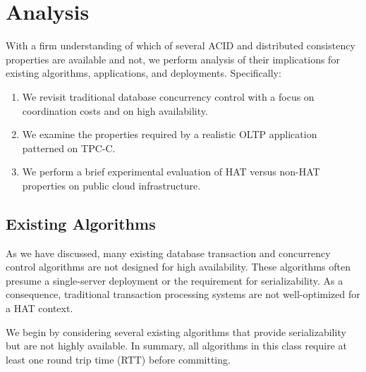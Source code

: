 
\section{Analysis}
\label{sec:evaluation}

With a firm understanding of which of several ACID and distributed
consistency properties are available and not, we perform analysis of
their implications for existing algorithms, applications, and
deployments. Specifically:

\begin{enumerate}
\item We revisit traditional database concurrency control with a focus
  on coordination costs and on high availability.
\item We examine the properties required by a realistic OLTP
  application patterned on TPC-C.
\item We perform a brief experimental evaluation of HAT versus non-HAT
  properties on public cloud infrastructure.
\end{enumerate}

\subsection{Existing Algorithms}

As we have discussed, many existing database transaction and
concurrency control algorithms are not designed for high
availability. These algorithms often presume a single-server
deployment or the requirement for serializability. As a consequence,
traditional transaction processing systems are not well-optimized for
a HAT context.

We begin by considering several existing algorithms that provide
serializability but are not highly available. In summary, all
algorithms in this class require at least one round trip time (RTT)
before committing.

